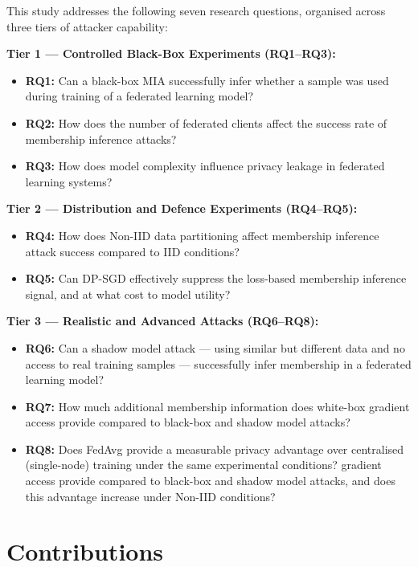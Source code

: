 \documentclass[12pt, a4paper]{report}
\begin{document}
This study addresses the following seven research questions, organised across
three tiers of attacker capability:

\noindent\textbf{Tier 1 --- Controlled Black-Box Experiments (RQ1--RQ3):}
\begin{itemize}[leftmargin=1.5em, itemsep=4pt]
  \item \textbf{RQ1:} Can a black-box MIA successfully infer whether a sample
        was used during training of a federated learning model?
  \item \textbf{RQ2:} How does the number of federated clients affect the success
        rate of membership inference attacks?
  \item \textbf{RQ3:} How does model complexity influence privacy leakage in
        federated learning systems?
\end{itemize}

\noindent\textbf{Tier 2 --- Distribution and Defence Experiments (RQ4--RQ5):}
\begin{itemize}[leftmargin=1.5em, itemsep=4pt]
  \item \textbf{RQ4:} How does Non-IID data partitioning affect membership
        inference attack success compared to IID conditions?
  \item \textbf{RQ5:} Can DP-SGD effectively suppress the loss-based membership
        inference signal, and at what cost to model utility?
\end{itemize}

\noindent\textbf{Tier 3 --- Realistic and Advanced Attacks (RQ6--RQ8):}
\begin{itemize}[leftmargin=1.5em, itemsep=4pt]
  \item \textbf{RQ6:} Can a shadow model attack --- using similar but different
        data and no access to real training samples --- successfully infer
        membership in a federated learning model?
  \item \textbf{RQ7:} How much additional membership information does white-box
  gradient access provide compared to black-box and shadow model attacks?
  \item \textbf{RQ8:} Does FedAvg provide a measurable privacy advantage over
  centralised (single-node) training under the same experimental conditions?
        gradient access provide compared to black-box and shadow model attacks,
        and does this advantage increase under Non-IID conditions?
\end{itemize}

\section{Contributions}
\end{document}
